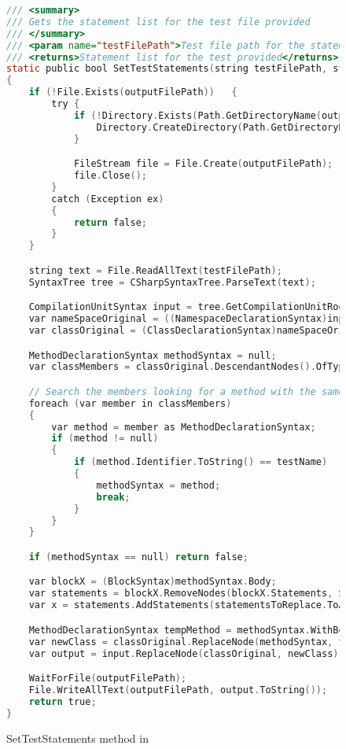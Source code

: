
\label{SetTestStatements Method}

\begin{figure}
\begin{lstlisting}[language=C]
/// <summary>
/// Gets the statement list for the test file provided
/// </summary>
/// <param name="testFilePath">Test file path for the statement list</param>
/// <returns>Statement list for the test provided</returns>
static public bool SetTestStatements(string testFilePath, string outputFilePath, string testName, List<StatementSyntax> statementsToReplace)
{
	if (!File.Exists(outputFilePath))	{
		try	{
			if (!Directory.Exists(Path.GetDirectoryName(outputFilePath)))	{
				Directory.CreateDirectory(Path.GetDirectoryName(outputFilePath));
			}

			FileStream file = File.Create(outputFilePath);
			file.Close();
		}
		catch (Exception ex)
		{
			return false;
		}
	}

	string text = File.ReadAllText(testFilePath);
	SyntaxTree tree = CSharpSyntaxTree.ParseText(text);

	CompilationUnitSyntax input = tree.GetCompilationUnitRoot();
	var nameSpaceOriginal = ((NamespaceDeclarationSyntax)input.Members[0]);
	var classOriginal = (ClassDeclarationSyntax)nameSpaceOriginal.Members[0];

	MethodDeclarationSyntax methodSyntax = null;
	var classMembers = classOriginal.DescendantNodes().OfType<MemberDeclarationSyntax>();

	// Search the members looking for a method with the same name as the test
	foreach (var member in classMembers)
	{
		var method = member as MethodDeclarationSyntax;
		if (method != null)
		{
			if (method.Identifier.ToString() == testName)
			{
				methodSyntax = method;
				break;
			}
		}
	}

	if (methodSyntax == null) return false;

	var blockX = (BlockSyntax)methodSyntax.Body;
	var statements = blockX.RemoveNodes(blockX.Statements, SyntaxRemoveOptions.KeepNoTrivia);
	var x = statements.AddStatements(statementsToReplace.ToArray());

	MethodDeclarationSyntax tempMethod = methodSyntax.WithBody(x);
	var newClass = classOriginal.ReplaceNode(methodSyntax, tempMethod);
	var output = input.ReplaceNode(classOriginal, newClass);

	WaitForFile(outputFilePath);
	File.WriteAllText(outputFilePath, output.ToString());
	return true;
}
\end{lstlisting}
\caption{SetTestStatements method in \mytool}
\label{fig:SetTestStatements1}
\end{figure}
